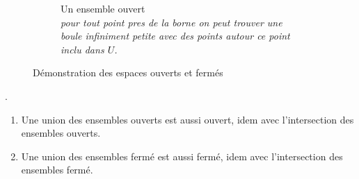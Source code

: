 \begin{figure}[H]
\begin{subfigure}{0.45\textwidth}
        \caption{Un ensemble ouvert\\
            \textit{
                pour tout point pres de la borne
                on peut trouver une boule
                infiniment petite avec des
                points autour ce point inclu dans $U$.
            }
        }

    \end{subfigure}
    \caption{Démonstration des espaces ouverts et fermés}
\end{figure}

\begin{prop}.
    \begin{enumerate}
        \item 
            Une union des ensembles ouverts est aussi ouvert, idem avec l'intersection des ensembles ouverts. 
        \item  
            Une union des ensembles fermé est aussi fermé, idem avec l'intersection des ensembles fermé. 
    \end{enumerate}
\end{prop}

